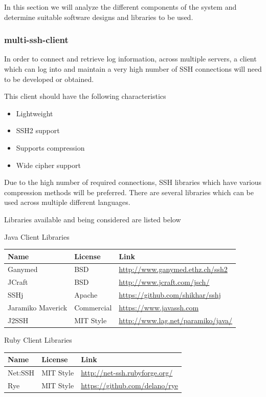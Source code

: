 \documentclass{llncs}
\begin{document}
In this section we will analyze the different components of the system and determine suitable software designs and libraries to be used.

\subsubsection{multi-ssh-client}

In order to connect and retrieve log information, across multiple servers, a client which can log into and maintain a very high number of SSH connections will need to be developed or obtained.

This client should have the following characteristics

\begin{itemize}
\item Lightweight
\item	SSH2 support
\item	Supports compression
\item	Wide cipher support
\end{itemize}

Due to the high number of required connections, SSH libraries which have various compression methods will be preferred. There are several libraries which can be used across multiple different languages.

Libraries available and being considered are listed below

Java Client Libraries

\begin{flushleft}
    \begin{tabular}{ | l | l | l |}
    \hline
    Name & License & Link \\ \hline
    Ganymed & BSD & \url{http://www.ganymed.ethz.ch/ssh2}  \\ \hline
    JCraft & BSD & \url{http://www.jcraft.com/jsch/}\\ \hline
    SSHj & Apache &  \url{https://github.com/shikhar/sshj}  \\ \hline
    Jaramiko Maverick &  Commercial &  \url{https://www.javassh.com}  \\ \hline
    J2SSH & MIT Style &  \url{http://www.lag.net/paramiko/java/} \\
    \hline
    \end{tabular}
\end{flushleft}

Ruby Client Libraries

\begin{flushleft}
    \begin{tabular}{ | l | l | l |}
    \hline
    Name & License & Link \\ \hline
    Net:SSH & MIT Style & \url{http://net-ssh.rubyforge.org/}  \\ \hline
    Rye & MIT Style & \url{https://github.com/delano/rye}\\ 
    \hline
    \end{tabular}
\end{flushleft}
\end{document}
